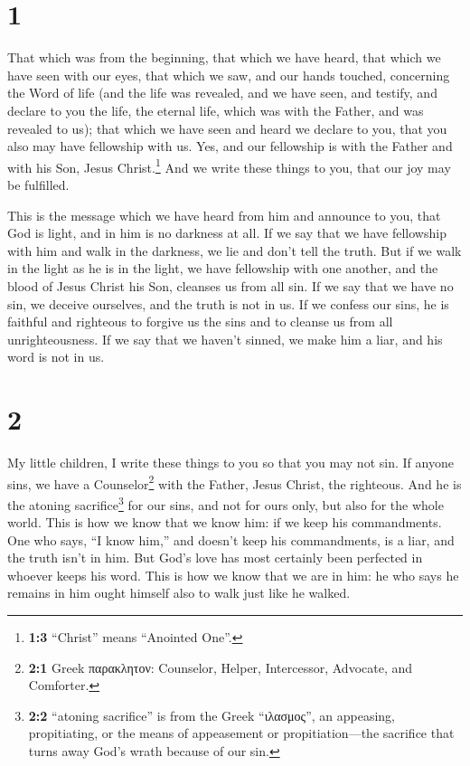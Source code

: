 \hypertarget{section}{%
\section{1}\label{section}}

 That which was from the beginning, that which we have
heard, that which we have seen with our eyes, that which we saw, and our
hands touched, concerning the Word of life  (and the life
was revealed, and we have seen, and testify, and declare to you the
life, the eternal life, which was with the Father, and was revealed to
us);  that which we have seen and heard we declare to you,
that you also may have fellowship with us. Yes, and our fellowship is
with the Father and with his Son, Jesus Christ.\footnote{\textbf{1:3}
  ``Christ'' means ``Anointed One''.}  And we write these
things to you, that our joy may be fulfilled.

 This is the message which we have heard from him and
announce to you, that God is light, and in him is no darkness at all.
 If we say that we have fellowship with him and walk in
the darkness, we lie and don't tell the truth.  But if we
walk in the light as he is in the light, we have fellowship with one
another, and the blood of Jesus Christ his Son, cleanses us from all
sin.  If we say that we have no sin, we deceive ourselves,
and the truth is not in us.  If we confess our sins, he is
faithful and righteous to forgive us the sins and to cleanse us from all
unrighteousness.  If we say that we haven't sinned, we
make him a liar, and his word is not in us.

\hypertarget{section-1}{%
\section{2}\label{section-1}}

 My little children, I write these things to you so that
you may not sin. If anyone sins, we have a Counselor\footnote{\textbf{2:1}
  Greek παρακλητον: Counselor, Helper, Intercessor, Advocate, and
  Comforter.} with the Father, Jesus Christ, the righteous.
 And he is the atoning sacrifice\footnote{\textbf{2:2}
  ``atoning sacrifice'' is from the Greek ``ιλασμος'', an appeasing,
  propitiating, or the means of appeasement or propitiation---the
  sacrifice that turns away God's wrath because of our sin.} for our
sins, and not for ours only, but also for the whole world.
 This is how we know that we know him: if we keep his
commandments.  One who says, ``I know him,'' and doesn't
keep his commandments, is a liar, and the truth isn't in him.
 But God's love has most certainly been perfected in
whoever keeps his word. This is how we know that we are in him:
 he who says he remains in him ought himself also to walk
just like he walked.

